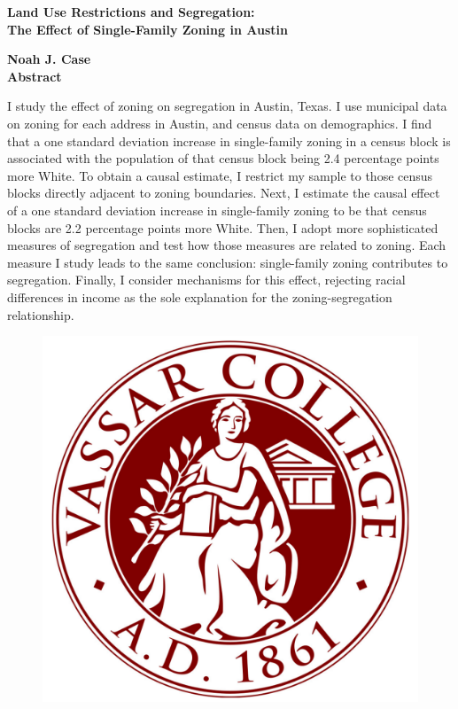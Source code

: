 \documentclass[11pt]{article}
\begin{document}
\begin{titlepage}
\setcounter{page}{1}
\begin{center}
\vspace{1cm}
\LARGE
\textbf{Land Use Restrictions and Segregation:\\ The Effect of Single-Family Zoning in Austin}



\Large
\vspace{.5cm}
\vspace{.5cm}
\textbf{Noah J. Case}\\
\vspace{.5cm}
\Large
\vspace{.5cm}
\large
\textbf{Abstract}
\end{center}


\begin{singlespace}
\noindent
I study the effect of zoning on segregation in Austin, Texas. I use municipal data on zoning for each address in Austin, and census data on demographics. I find that a one standard deviation increase in single-family zoning in a census block is associated with the population of that census block being 2.4 percentage points more White. To obtain a causal estimate, I restrict my sample to those census blocks directly adjacent to zoning boundaries. Next, I estimate the causal effect of a one standard deviation increase in single-family zoning to be that census blocks are 2.2 percentage points more White. Then, I adopt more sophisticated measures of segregation and test how those measures are related to zoning. Each measure I study leads to the same conclusion: single-family zoning contributes to segregation. Finally, I consider mechanisms for this effect, rejecting racial differences in income as the sole explanation for the zoning-segregation relationship.

\end{singlespace}
\vspace{0.4in}

\begin{figure}[H]
 \begin{center}
 \includegraphics[width = .4\textwidth]{Vassar_Seal.pdf}
 \end{center}
 \end{figure}




\end{titlepage}
\end{document}
